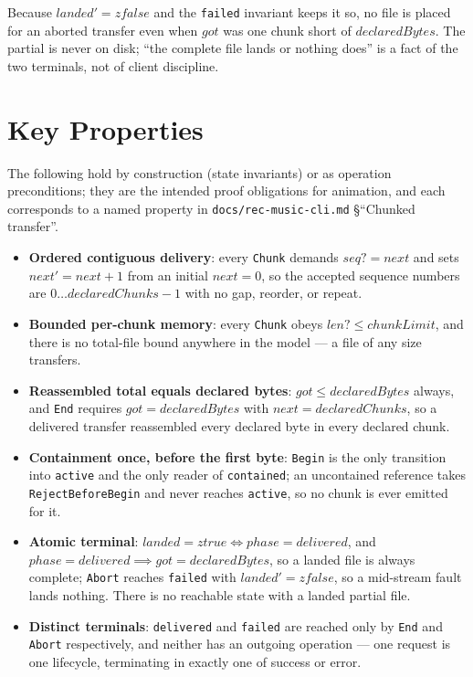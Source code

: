\documentclass[a4paper,10pt,fleqn]{article}
\begin{document}
Because $landed'= zfalse$ and the \texttt{failed} invariant keeps it so, no file
is placed for an aborted transfer even when $got$ was one chunk short of
$declaredBytes$. The partial is never on disk; ``the complete file lands or
nothing does'' is a fact of the two terminals, not of client discipline.

\section{Key Properties}

The following hold by construction (state invariants) or as operation
preconditions; they are the intended proof obligations for animation, and each
corresponds to a named property in \texttt{docs/rec-music-cli.md}
\S``Chunked transfer''.

\begin{itemize}
  \item \textbf{Ordered contiguous delivery}: every \texttt{Chunk} demands
    $seq? = next$ and sets $next' = next + 1$ from an initial $next = 0$, so the
    accepted sequence numbers are $0 \dots declaredChunks - 1$ with no gap,
    reorder, or repeat.
  \item \textbf{Bounded per-chunk memory}: every \texttt{Chunk} obeys
    $len? \leq chunkLimit$, and there is no total-file bound anywhere in the
    model --- a file of any size transfers.
  \item \textbf{Reassembled total equals declared bytes}: $got \leq
    declaredBytes$ always, and \texttt{End} requires $got = declaredBytes$ with
    $next = declaredChunks$, so a delivered transfer reassembled every declared
    byte in every declared chunk.
  \item \textbf{Containment once, before the first byte}: \texttt{Begin} is the
    only transition into \texttt{active} and the only reader of
    \texttt{contained}; an uncontained reference takes \texttt{RejectBeforeBegin}
    and never reaches \texttt{active}, so no chunk is ever emitted for it.
  \item \textbf{Atomic terminal}: $landed = ztrue \iff phase = delivered$, and
    $phase = delivered \implies got = declaredBytes$, so a landed file is always
    complete; \texttt{Abort} reaches \texttt{failed} with $landed' = zfalse$, so
    a mid-stream fault lands nothing. There is no reachable state with a landed
    partial file.
  \item \textbf{Distinct terminals}: \texttt{delivered} and \texttt{failed} are
    reached only by \texttt{End} and \texttt{Abort} respectively, and neither has
    an outgoing operation --- one request is one lifecycle, terminating in
    exactly one of success or error.
\end{itemize}
\end{document}
